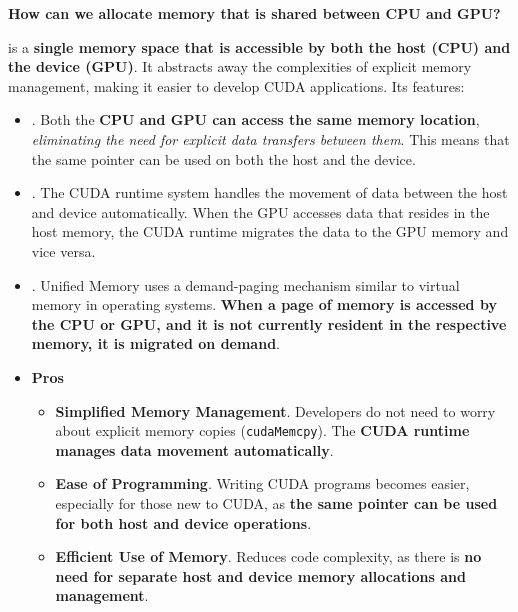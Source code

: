 \begin{flushleft}
    \textcolor{Green3}{ \textbf{How can we allocate memory that is shared between CPU and GPU?}}
\end{flushleft}
 is a \textbf{single memory space that is accessible by both the host (CPU) and the device (GPU)}. It abstracts away the complexities of explicit memory management, making it easier to develop CUDA applications. Its features:
\begin{itemize}
    \item {}. Both the \textbf{CPU and GPU can access the same memory location}, \emph{eliminating the need for explicit data transfers between them}. This means that the same pointer can be used on both the host and the device.

    \item {}. The CUDA runtime system handles the movement of data between the host and device automatically. When the GPU accesses data that resides in the host memory, the CUDA runtime migrates the data to the GPU memory and vice versa.

    \item {}. Unified Memory uses a demand-\break paging mechanism similar to virtual memory in operating systems. \textbf{When a page of memory is accessed by the CPU or GPU, and it is not currently resident in the respective memory, it is migrated on demand}.

    \item[\textcolor{Green3}{\faIcon{check-circle}}] \textcolor{Green3}{\textbf{Pros}}
    \begin{itemize}
        \item[\textcolor{Green3}{\faIcon{check}}] \textcolor{Green3}{\textbf{Simplified Memory Management}}. Developers do not need to worry about explicit memory copies (\texttt{cudaMemcpy}). The \textbf{CUDA runtime manages data movement automatically}.
        
        \item[\textcolor{Green3}{\faIcon{check}}] \textcolor{Green3}{\textbf{Ease of Programming}}. Writing CUDA programs becomes easier, especially for those new to CUDA, as \textbf{the same pointer can be used for both host and device operations}.
        
        \item[\textcolor{Green3}{\faIcon{check}}] \textcolor{Green3}{\textbf{Efficient Use of Memory}}. Reduces code complexity, as there is \textbf{no need for separate host and device memory allocations and management}.
    \end{itemize}


\end{itemize}
